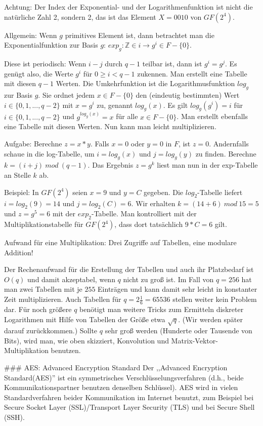 \documentclass[a4paper]{article}
\begin{document}
\begin{multicols}{3}
    Achtung: Der Index der Exponential- und der Logarithmenfunktion ist nicht die natürliche Zahl 2, sondern 2, das ist das Element $X=0010$ von $GF(2^4)$.

    Allgemein: Wenn $g$ primitives Element ist, dann betrachtet man die Exponentialfunktion zur Basis $g$: $exp_g:\mathbb{Z}\in i\rightarrow g^i\in F-\{0\}$.

    Diese ist periodisch: Wenn $i-j$ durch $q-1$ teilbar ist, dann ist $g^i=g^j$. Es genügt also, die Werte $g^i$ für $0\geq i<q-1$ zukennen. Man erstellt eine Tabelle mit diesen $q-1$ Werten.
    Die Umkehrfunktion ist die Logarithmusfunktion $log_g$ zur Basis $g$. Sie ordnet jedem $x\in F-\{0\}$ den (eindeutig bestimmten) Wert $i\in\{0,1,...,q-2\}$ mit $x=g^i$ zu, genannt $log_g(x)$. Es gilt $log_g(g^i)=i$ für $i\in\{0,1,...,q-2\}$ und $g^{log_g(x)}=x$ für alle $x\in F-\{0\}$. Man erstellt ebenfalls eine Tabelle mit diesen Werten.
    Nun kann man leicht multiplizieren.

    Aufgabe: Berechne $z=x*y$.
    Falls $x=0$ oder $y=0$ in $F$, ist $z=0$. Andernfalls schaue in die log-Tabelle, um $i=log_g(x)$ und $j=log_g(y)$ zu finden. Berechne $k=(i+j)\ mod\ (q-1)$. Das Ergebnis $z=g^k$ liest man nun in der exp-Tabelle an Stelle $k$ ab.

    Beispiel: In $GF(2^4)$ seien $x=9$ und $y=C$ gegeben. Die $log_2$-Tabelle liefert $i=log_2(9)=14$ und $j=log_2(C)=6$. Wir erhalten $k= (14+6)\ mod\ 15 = 5$ und $z=g^5=6$ mit der $exp_2$-Tabelle. Man kontrolliert mit der Multiplikationstabelle für $GF(2^4)$, dass dort tatsächlich $9*C=6$ gilt.

    Aufwand für eine Multiplikation: Drei Zugriffe auf Tabellen, eine modulare Addition!

    Der Rechenaufwand für die Erstellung der Tabellen und auch ihr Platzbedarf ist $O(q)$ und damit akzeptabel, wenn $q$ nicht zu groß ist. Im Fall von $q=256$ hat man zwei Tabellen mit je $255$ Einträgen und kann damit sehr leicht in konstanter Zeit multiplizieren. Auch Tabellen für $q=2\frac{1}{6}=65536$ stellen weiter kein Problem dar. Für noch größere $q$ benötigt man weitere Tricks zum Ermitteln diskreter Logarithmen mit Hilfe von Tabellen der Größe etwa $\sqrt{q}$. (Wir werden später darauf zurückkommen.) Sollte $q$ sehr groß werden (Hunderte oder Tausende von Bits), wird man, wie oben skizziert, Konvolution und Matrix-Vektor-Multiplikation benutzen.

    ### AES: Advanced Encryption Standard
    Der ,,Advanced Encryption Standard(AES)'' ist ein symmetrisches Verschlüsselungsverfahren (d.h., beide Kommunikationspartner benutzen denselben Schlüssel). AES wird in vielen Standardverfahren beider Kommunikation im Internet benutzt, zum Beispiel bei Secure Socket Layer (SSL)/Transport Layer Security (TLS) und bei Secure Shell (SSH).


\end{multicols}
\end{document}
